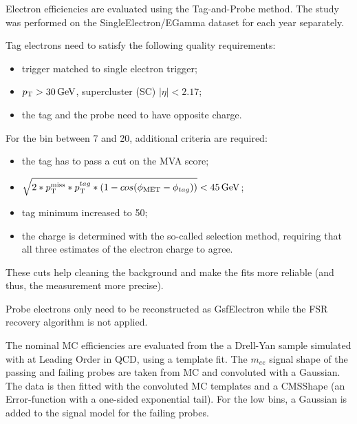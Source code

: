 Electron efficiencies are evaluated using the Tag-and-Probe method.
The study was performed on the SingleElectron/EGamma dataset for each year separately.

Tag electrons need to satisfy the following quality requirements:
\begin{itemize}
\item trigger matched to single electron trigger;
\item $p_{\mathrm{T}} > 30 \,\text{Ge\hspace{-.08em}V}$, supercluster (SC) $|\eta| < 2.17$;%
\item the tag and the probe need to have opposite charge.
\end{itemize}

For the bin between 7 and 20\GeV, additional criteria are required:
\begin{itemize}
\item the tag has to pass a cut on the MVA score;
\item $\sqrt{2*p_{\mathrm{T}}^\text{miss}*p_{\mathrm{T}}^{tag}*(1-cos(\phi_{\rm MET}-\phi_{tag}))} < 45 \,\text{Ge\hspace{-.08em}V}$;
\item tag minimum \pt increased to 50\GeV;
\item the charge is determined with the so-called selection method, requiring that all three estimates of the electron charge to agree.
\end{itemize}
These cuts help cleaning the background and make the fits more reliable (and thus, the measurement more precise).

Probe electrons only need to be reconstructed as GsfElectron while the FSR recovery algorithm is not applied.

The nominal MC efficiencies are evaluated from the a Drell-Yan sample simulated with \MADGRAPH at Leading Order in QCD,
using a template fit.
The $m_{ee}$ signal shape of the passing and failing probes are taken from MC and convoluted with a Gaussian.
The data is then fitted with the convoluted MC templates and a CMSShape (an Error-function with a one-sided exponential tail).
For the low \pt bins, a Gaussian is added to the signal model for the failing probes.


